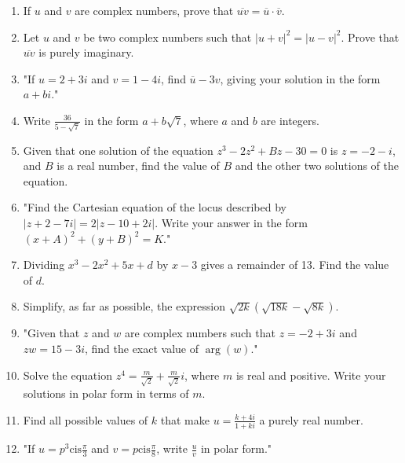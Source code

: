 \documentclass{article}
\begin{document}
\begin{enumerate}
\vspace{3cm}
\item If \( u \) and \( v \) are complex numbers, prove that \( \overline{uv} = \overline{u} \cdot \overline{v} \).
\vspace{3cm}
\item Let \( u \) and \( v \) be two complex numbers such that \( |u+v|^2 = |u-v|^2 \). Prove that \( \overline{uv} \) is purely imaginary.
\vspace{3cm}
\item "If \( u = 2 + 3i \) and \( v = 1 - 4i \), find \( \overline{u} - 3v \), giving your solution in the form \( a + bi \)."
\vspace{3cm}
\item Write \( \frac{36}{5 - \sqrt{7}} \) in the form \( a + b\sqrt{7} \), where \( a \) and \( b \) are integers.
\vspace{3cm}
\item Given that one solution of the equation \( z^3 - 2z^2 + Bz - 30 = 0 \) is \( z = -2 - i \), and \( B \) is a real number, find the value of \( B \) and the other two solutions of the equation.
\vspace{3cm}
\item "Find the Cartesian equation of the locus described by \( |z + 2 - 7i| = 2|z - 10 + 2i| \). Write your answer in the form \( (x + A)^2 + (y + B)^2 = K \)."
\vspace{3cm}
\item Dividing \(x^3 - 2x^2 + 5x + d\) by \(x - 3\) gives a remainder of 13. Find the value of \(d\).
\vspace{3cm}
\item Simplify, as far as possible, the expression \(\sqrt{2k} \left( \sqrt{18k} - \sqrt{8k} \right)\).
\vspace{3cm}
\item "Given that \(z\) and \(w\) are complex numbers such that \(z = -2 + 3i\) and \(zw = 15 - 3i\), find the exact value of \(\arg(w)\)."
\vspace{3cm}
\item Solve the equation \( z^4 = \frac{m}{\sqrt{2}} + \frac{m}{\sqrt{2}} i \), where \( m \) is real and positive. Write your solutions in polar form in terms of \( m \).
\vspace{3cm}
\item Find all possible values of \( k \) that make \( u = \frac{k + 4i}{1 + ki} \) a purely real number.
\vspace{3cm}
\item "If \( u = p^{3} \text{cis} \frac{\pi}{3} \) and \( v = p \text{cis} \frac{\pi}{8} \), write \( \frac{u}{v} \) in polar form."

\end{enumerate}
\end{document}

